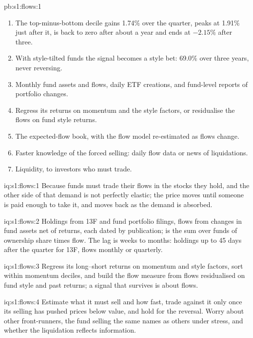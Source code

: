 \begin{solution}{pb:s1:flows:1}
\begin{enumerate}
\item The top-minus-bottom decile gains 1.74\% over the quarter, peaks at 1.91\% just after it, is back to zero after about a year and ends at $-2.15\%$ after
three.
\item With style-tilted funds the signal becomes a style bet: 69.0\% over three years, never reversing.
\item Monthly fund assets and flows, daily ETF creations, and fund-level reports of portfolio changes.
\item Regress its returns on momentum and the style factors, or residualise the flows on fund style returns.
\item The expected-flow book, with the flow model re-estimated as flows change.
\item Faster knowledge of the forced selling: daily flow data or news of liquidations.
\item Liquidity, to investors who must trade.
\end{enumerate}
\end{solution}

\begin{solution}{iq:s1:flows:1}
Because funds must trade their flows in the stocks they hold, and the other side of that demand is not perfectly elastic; the price moves until someone is
paid enough to take it, and moves back as the demand is absorbed.
\end{solution}

\begin{solution}{iq:s1:flows:2}
Holdings from 13F and fund portfolio filings, flows from changes in fund assets net of returns, each dated by publication;  is the sum over
funds of ownership share times flow. The lag is weeks to months: holdings up to 45 days after the quarter for 13F, flows monthly or quarterly.
\end{solution}

\begin{solution}{iq:s1:flows:3}
Regress its long--short returns on momentum and style factors, sort within momentum deciles, and build the flow measure from flows residualised on fund
style and past returns; a signal that survives is about flows.
\end{solution}

\begin{solution}{iq:s1:flows:4}
Estimate what it must sell and how fast, trade against it only once its selling has pushed prices below value, and hold for the reversal. Worry about other
front-runners, the fund selling the same names as others under stress, and whether the liquidation reflects information.
\end{solution}

